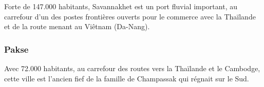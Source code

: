 \begin{multicols}{2}
Forte de 147.000 habitants, Savannakhet est un port fluvial important, au carrefour d’un des postes frontières ouverts pour le commerce avec la Thaïlande et de la route menant au Viêtnam (Da-Nang).

\subsubsection{Pakse}

Avec 72.000 habitants, au carrefour des routes vers la Thaïlande et le Cambodge, cette ville est l’ancien fief de la famille de Champassak qui régnait sur le Sud.

\end{multicols}


